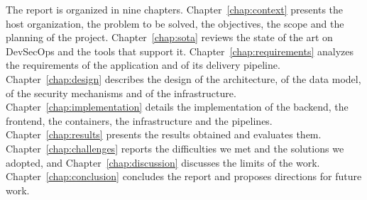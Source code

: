 The report is organized in nine chapters. Chapter~\ref{chap:context} presents the host organization, the problem to be solved, the objectives, the scope and the planning of the project. Chapter~\ref{chap:sota} reviews the state of the art on DevSecOps and the tools that support it. Chapter~\ref{chap:requirements} analyzes the requirements of the application and of its delivery pipeline. Chapter~\ref{chap:design} describes the design of the architecture, of the data model, of the security mechanisms and of the infrastructure. Chapter~\ref{chap:implementation} details the implementation of the backend, the frontend, the containers, the infrastructure and the pipelines. Chapter~\ref{chap:results} presents the results obtained and evaluates them. Chapter~\ref{chap:challenges} reports the difficulties we met and the solutions we adopted, and Chapter~\ref{chap:discussion} discusses the limits of the work. Chapter~\ref{chap:conclusion} concludes the report and proposes directions for future work.
